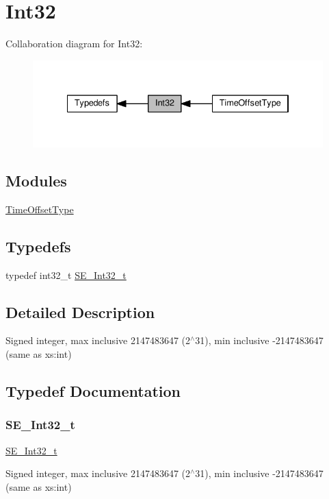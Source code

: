 \hypertarget{group__Int32}{}\section{Int32}
\label{group__Int32}
Collaboration diagram for Int32\+:\nopagebreak
\begin{figure}[H]
\begin{center}
\leavevmode
\includegraphics[width=334pt]{group__Int32}
\end{center}
\end{figure}
\subsection*{Modules}
\begin{DoxyCompactItemize}
\item 
\hyperlink{group__TimeOffsetType}{Time\+Offset\+Type}
\end{DoxyCompactItemize}
\subsection*{Typedefs}
\begin{DoxyCompactItemize}
\item 
typedef int32\+\_\+t \hyperlink{group__Int32_gaa7afc819cfc8033c5fa408e34da8b71a}{S\+E\+\_\+\+Int32\+\_\+t}
\end{DoxyCompactItemize}


\subsection{Detailed Description}
Signed integer, max inclusive 2147483647 (2$^\wedge$31), min inclusive -\/2147483647 (same as xs\+:int) 

\subsection{Typedef Documentation}
\mbox{\label{group__Int32_gaa7afc819cfc8033c5fa408e34da8b71a}} 
\subsubsection{\texorpdfstring{S\+E\+\_\+\+Int32\+\_\+t}{SE\_Int32\_t}}
{\footnotesize\ttfamily \hyperlink{group__Int32_gaa7afc819cfc8033c5fa408e34da8b71a}{S\+E\+\_\+\+Int32\+\_\+t}}

Signed integer, max inclusive 2147483647 (2$^\wedge$31), min inclusive -\/2147483647 (same as xs\+:int) 